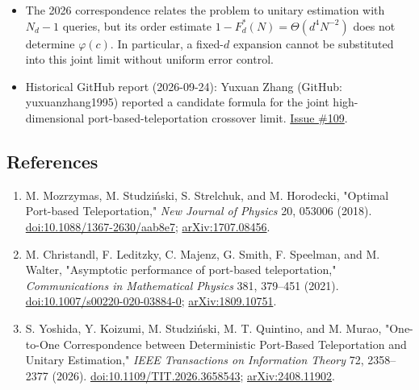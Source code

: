 \begin{itemize}
The displayed definitions, constraints, and target bounds are recorded in Eqs.~\eqref{eq:2534-7}, \eqref{eq:2534-8}.

  \item The 2026 correspondence relates the problem to unitary estimation with $N_d-1$ queries, but its order estimate $1-F_d^*(N)=\Theta(d^4N^{-2})$ does not determine $\varphi(c)$. In particular, a fixed-$d$ expansion cannot be substituted into this joint limit without uniform error control. 

  \item Historical GitHub report (2026-09-24): Yuxuan Zhang (GitHub: yuxuanzhang1995) reported a candidate formula for the joint high-dimensional port-based-teleportation crossover limit. \href{https://github.com/Naixu-Guo/quantum-open-problems/issues/109}{Issue \#109}.
\end{itemize}

\subsection*{References}

\begin{enumerate}[label={},leftmargin=4.8em,labelsep=0.5em]
  \footnotesize
  \item[\textup{[Mozrzymas18]}]\label{ref:2534-mozrzymas18}
  M. Mozrzymas, M. Studziński, S. Strelchuk, and M. Horodecki, "Optimal Port-based Teleportation," \emph{New Journal of Physics} 20, 053006 (2018). \href{https://doi.org/10.1088/1367-2630/aab8e7}{doi:10.1088/1367-2630/aab8e7}; \href{https://arxiv.org/abs/1707.08456}{arXiv:1707.08456}.

  \item[\textup{[Christandl21]}]\label{ref:2534-christandl21}
  M. Christandl, F. Leditzky, C. Majenz, G. Smith, F. Speelman, and M. Walter, "Asymptotic performance of port-based teleportation," \emph{Communications in Mathematical Physics} 381, 379–451 (2021). \href{https://doi.org/10.1007/s00220-020-03884-0}{doi:10.1007/s00220-020-03884-0}; \href{https://arxiv.org/abs/1809.10751}{arXiv:1809.10751}.

  \item[\textup{[Yoshida26]}]\label{ref:2534-yoshida26}
  S. Yoshida, Y. Koizumi, M. Studziński, M. T. Quintino, and M. Murao, "One-to-One Correspondence between Deterministic Port-Based Teleportation and Unitary Estimation," \emph{IEEE Transactions on Information Theory} 72, 2358–2377 (2026). \href{https://doi.org/10.1109/TIT.2026.3658543}{doi:10.1109/TIT.2026.3658543}; \href{https://arxiv.org/abs/2408.11902}{arXiv:2408.11902}.
\end{enumerate}

